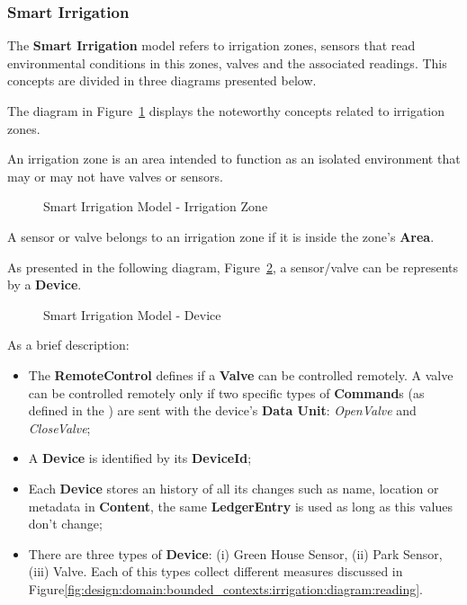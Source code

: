 \subsubsection{Smart Irrigation}
\label{subsubsec:design:domain:bounded_contexts:irrigation}

The \textbf{Smart Irrigation} model refers to irrigation zones, sensors that read environmental conditions in this zones, valves and the associated readings. This concepts are divided in three diagrams presented below.

The diagram in Figure~\ref{fig:design:domain:bounded_contexts:irrigation:diagram:garden} displays the noteworthy concepts related to irrigation zones.

An irrigation zone is an area intended to function as an isolated environment that may or may not have valves or sensors.

\begin{figure}[H]
   \centering
  \resizebox{0.7\columnwidth}{!}
  {
     
  }
  \caption[Smart Irrigation Model - Irrigation Zone]{Smart Irrigation Model - Irrigation Zone}
  \label{fig:design:domain:bounded_contexts:irrigation:diagram:garden}
\end{figure}

A sensor or valve belongs to an irrigation zone if it is inside the zone's \textbf{Area}.

As presented in the following diagram, Figure~\ref{fig:design:domain:bounded_contexts:irrigation:diagram:device}, a sensor/valve can be represents by a \textbf{Device}.

\begin{figure}[H]
   \centering
  \resizebox{\columnwidth}{!}
  {
     
  }
  \caption[Smart Irrigation Model - Device]{Smart Irrigation Model - Device}
  \label{fig:design:domain:bounded_contexts:irrigation:diagram:device}
\end{figure}

As a brief description:

\begin{itemize}
   \item The \textbf{RemoteControl} defines if a \textbf{Valve} can be controlled remotely. A valve can be controlled remotely only if two specific types of \textbf{Command}s (as defined in the ) are sent with the device's \textbf{Data Unit}: \textit{OpenValve} and \textit{CloseValve};
   \item A \textbf{Device} is identified by its \textbf{DeviceId};
   \item Each \textbf{Device} stores an history of all its changes such as name, location or metadata in \textbf{Content}, the same \textbf{LedgerEntry} is used as long as this values don't change;
   \item There are three types of \textbf{Device}: (i) Green House Sensor, (ii) Park Sensor, (iii) Valve. Each of this types collect different measures discussed in Figure\ref{fig:design:domain:bounded_contexts:irrigation:diagram:reading}.
\end{itemize}

